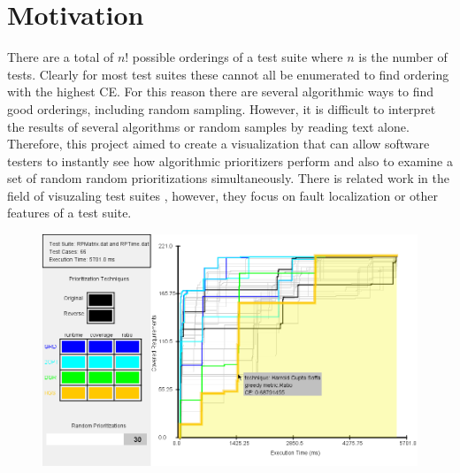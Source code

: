 \documentclass{vgtc}                          %
\begin{document}
\section{Motivation}

There are a total of $n$! possible orderings of a test suite where $n$ is the number of tests.  Clearly for most test suites these cannot all be enumerated to find ordering with the highest CE.  For this reason there are several algorithmic ways to find good orderings, including random sampling.  However, it is difficult to interpret the results of several algorithms or random samples by reading text alone.  Therefore, this project aimed to create a visualization that can allow software testers to instantly see how algorithmic prioritizers perform and also to examine a set of random random prioritizations simultaneously.  There is related work in the field of visuzaling test suites \cite{tarantula} \cite{bart}, however, they focus on fault localization or other features of a test suite.

\begin{figure}
\includegraphics[scale=.3]{screenshot}
\end{figure}




\end{document}
